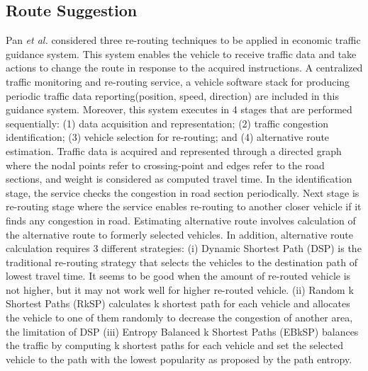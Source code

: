 \documentclass[conference]{IEEEtran}
\begin{document}
\subsection{Route Suggestion}
Pan \textit{et al.} \cite{pan2012proactive} considered three re-routing techniques to be applied in economic traffic guidance system. This system enables the vehicle to receive traffic data and take actions to change the route in response to the acquired instructions. A centralized traffic monitoring and re-routing service, a vehicle software stack for producing periodic traffic data reporting(position, speed, direction) are included in this guidance system. Moreover, this system executes in 4 stages that are performed sequentially: (1) data acquisition and representation; (2) traffic congestion identification; (3) vehicle selection
for re-routing; and (4) alternative route estimation.  
Traffic data is acquired and represented through a directed graph where the nodal points refer to crossing-point and edges refer to the road sections, and weight is considered as computed travel time. In the identification stage, the service checks the congestion in road section periodically. Next stage is re-routing stage where the service enables re-routing to another closer vehicle if it finds any congestion in road. Estimating alternative route involves calculation of the alternative route to formerly selected vehicles. 
In addition, alternative route calculation requires 3 different strategies: (i) Dynamic Shortest Path (DSP) is the traditional re-routing strategy that selects the vehicles to the destination path of lowest travel time. It seems to be good when the amount of re-routed vehicle is not higher, but it may not work well for higher re-routed vehicle. (ii) Random k Shortest  Paths (RkSP) calculates k shortest path for each vehicle and allocates the vehicle to one of them randomly to decrease the congestion of another area, the limitation of DSP (iii) Entropy  Balanced k Shortest  Paths  (EBkSP) balances the traffic by computing k shortest paths for each
vehicle and set the selected vehicle to the path with the lowest popularity as proposed by the path entropy. 
\end{document}
